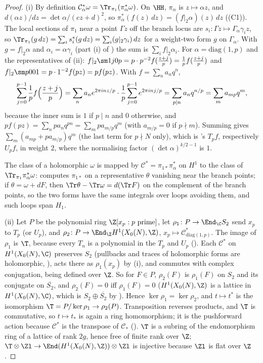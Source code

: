 \begin{proof}
(i) By definition $\mathcal C_\alpha^*\omega=\Tr_{\pi_1}(\pi_\alpha^*\omega)$. On $\HH$, $\pi_\alpha$ is $z\mapsto\alpha z$, and $d(\alpha z)/dz=\det\alpha/(cz+d)^2$, so $\pi_\alpha^*(f(z)\,dz)=(f|_2\alpha)(z)\,dz$
((C1)). The local sections of $\pi_1$ near a point $\Gamma z$ off the branch locus are $s_i\colon\Gamma z\mapsto\Gamma_\alpha\gamma_iz$, so
$\Tr_{\pi_1}(g\,dz)=\sum_is_i^*(g\,dz)=\sum_i(g|_2\gamma_i)\,dz$ for a weight-two form $g$ on $\Gamma_\alpha$. With $g=f|_2\alpha$ and $\alpha_i=\alpha\gamma_i$ (part (i) of
) the sum is $\sum_if|_2\alpha_i$. For $\alpha=\mathrm{diag}(1,p)$ and the representatives of
(ii): $f|_2\sm1j0p=p\cdot p^{-2}f(\frac{z+j}p)=\frac1pf(\frac{z+j}p)$ and $f|_2\sm p001=p\cdot1^{-2}f(pz)=pf(pz)$. With $f=\sum_na_nq^n$,
\[
\sum_{j=0}^{p-1}\frac1pf\Bigl(\frac{z+j}p\Bigr)=\sum_na_ne^{2\pi inz/p}\cdot\frac1p\sum_{j=0}^{p-1}e^{2\pi inj/p}=\sum_{p\mid n}a_nq^{n/p}=\sum_ma_{mp}q^m,
\]
because the inner sum is $1$ if $p\mid n$ and $0$ otherwise, and $pf(pz)=\sum_npa_nq^{pn}=\sum_mpa_{m/p}q^m$ (with $a_{m/p}=0$ if $p\nmid m$). Summing gives $\sum_m(a_{mp}+pa_{m/p})q^m$ (the last term for
$p\nmid N$ only), which is 's $T_pf$, respectively $U_pf$, in weight $2$, where the normalising factor $(\det\alpha)^{k/2-1}$ is $1$.

The class of a holomorphic $\omega$ is mapped by $\mathcal C^*=\pi_{1*}\pi_\alpha^*$ on $H^1$ to the class of $\Tr_{\pi_1}\pi_\alpha^*\omega$:  computes $\pi_{1*}$ on a representative
$\theta$ vanishing near the branch points; if $\theta=\omega+dF$, then $\Tr\theta-\Tr\omega=d(\Tr F)$ on the complement of the branch points, so the two forms have the same
integrals over loops avoiding them, and such loops span $H_1$.

(ii) Let $P$ be the polynomial ring $\Z[x_p:p\text{ prime}]$, let $\rho_1\colon P\to\End_\C S_2$ send $x_p$ to $T_p$ (or $U_p$), and $\rho_2\colon P\to\End_\Z H^1(X_0(N),\Z)$, $x_p\mapsto\mathcal C_{\mathrm{diag}(1,p)}^*$. The image
of $\rho_1$ is $\T$, because every $T_n$ is a polynomial in the $T_p$ and $U_p$ (). Each $\mathcal C^*$ on $H^1(X_0(N),\C)$ preserves $S_2$ (pullbacks and traces of
holomorphic forms are holomorphic, ), acts there as $\rho_1(x_p)$ by (i), and commutes with complex conjugation, being defined over $\Z$. So for
$F\in P$, $\rho_2(F)$ is $\rho_1(F)$ on $S_2$ and its conjugate on $\overline{S_2}$, and $\rho_2(F)=0$ iff $\rho_1(F)=0$ ($H^1(X_0(N),\Z)$ is a lattice in $H^1(X_0(N),\C)$, which is
$S_2\oplus\overline{S_2}$ by ). Hence $\ker\rho_1=\ker\rho_2$, and $t\mapsto t^*$ is the isomorphism $\T=P/\ker\rho_1\to\rho_2(P)$. Transposition reverses products,
and $\T$ is commutative, so $t\mapsto t_*$ is again a ring homomorphism; it is the pushforward action because $\mathcal C^*$ is the transpose of $\mathcal C_*$ (). $\T$ is
a subring of the endomorphism ring of a lattice of rank $2g$, hence free of finite rank over $\Z$; $\T\otimes\Zl\to\End(H^1(X_0(N),\Z))\otimes\Zl$ is injective because
$\Zl$ is flat over $\Z$.


\end{proof}
